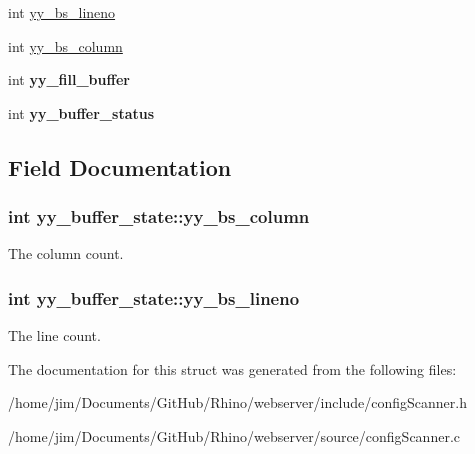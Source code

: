 \begin{DoxyCompactItemize}
\item 
int \hyperlink{structyy__buffer__state_a818e94bc9c766e683c60df1e9fd01199}{yy\+\_\+bs\+\_\+lineno}
\item 
int \hyperlink{structyy__buffer__state_a10c4fcd8be759e6bf11e6d3e8cdb0307}{yy\+\_\+bs\+\_\+column}
\item 
\hypertarget{structyy__buffer__state_a63d2afbb1d79a3fc63df9e12626f827d}{}int {\bfseries yy\+\_\+fill\+\_\+buffer}\label{structyy__buffer__state_a63d2afbb1d79a3fc63df9e12626f827d}

\item 
\hypertarget{structyy__buffer__state_a70fd925d37a2f0454fbd0def675d106c}{}int {\bfseries yy\+\_\+buffer\+\_\+status}\label{structyy__buffer__state_a70fd925d37a2f0454fbd0def675d106c}

\end{DoxyCompactItemize}


\subsection{Field Documentation}
\hypertarget{structyy__buffer__state_a10c4fcd8be759e6bf11e6d3e8cdb0307}{}
\subsubsection[{yy\+\_\+bs\+\_\+column}]{\setlength{\rightskip}{0pt plus 5cm}int yy\+\_\+buffer\+\_\+state\+::yy\+\_\+bs\+\_\+column}\label{structyy__buffer__state_a10c4fcd8be759e6bf11e6d3e8cdb0307}
The column count. \hypertarget{structyy__buffer__state_a818e94bc9c766e683c60df1e9fd01199}{}
\subsubsection[{yy\+\_\+bs\+\_\+lineno}]{\setlength{\rightskip}{0pt plus 5cm}int yy\+\_\+buffer\+\_\+state\+::yy\+\_\+bs\+\_\+lineno}\label{structyy__buffer__state_a818e94bc9c766e683c60df1e9fd01199}
The line count. 

The documentation for this struct was generated from the following files\+:\begin{DoxyCompactItemize}
\item 
/home/jim/\+Documents/\+Git\+Hub/\+Rhino/webserver/include/config\+Scanner.\+h\item 
/home/jim/\+Documents/\+Git\+Hub/\+Rhino/webserver/source/config\+Scanner.\+c\end{DoxyCompactItemize}
